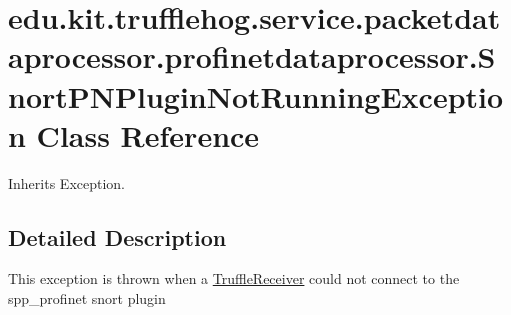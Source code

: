 \hypertarget{classedu_1_1kit_1_1trufflehog_1_1service_1_1packetdataprocessor_1_1profinetdataprocessor_1_1_sno4aaa71bd824f4bbe3e1d473b411fa125}{}\section{edu.\+kit.\+trufflehog.\+service.\+packetdataprocessor.\+profinetdataprocessor.\+Snort\+P\+N\+Plugin\+Not\+Running\+Exception Class Reference}
\label{classedu_1_1kit_1_1trufflehog_1_1service_1_1packetdataprocessor_1_1profinetdataprocessor_1_1_sno4aaa71bd824f4bbe3e1d473b411fa125}


Inherits Exception.



\subsection{Detailed Description}
This exception is thrown when a \hyperlink{classedu_1_1kit_1_1trufflehog_1_1service_1_1packetdataprocessor_1_1profinetdataprocessor_1_1_truffle_receiver}{Truffle\+Receiver} could not connect to the spp\+\_\+profinet snort plugin 